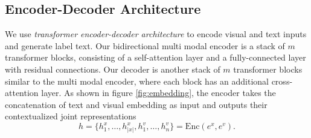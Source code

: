 \documentclass[twocolumn,3p,a4paper,preprint,11pt,margin=2.5cm]{elsarticle}
\begin{document}
\subsection{Encoder-Decoder Architecture}
We use\textit{ transformer encoder-decoder architecture} \cite{vaswani} to encode visual and text inputs and generate label text. Our bidirectional multi modal encoder is a stack of $m$ transformer blocks, consisting of a self-attention layer and a fully-connected layer with residual connections. Our decoder is another stack of $m$ transformer blocks similar to the multi modal encoder, where each block has an additional cross-attention layer. As shown in figure \ref{fig:embedding}, the encoder takes the concatenation of text and visual embedding as input and outputs their contextualized joint representations 
$$ h = \{h^x_1, \dots, h^x_{|x|}, h^v_1, \dots, h^v_n\} = \text{Enc}(e^x, e^v). $$ 
\end{document}
